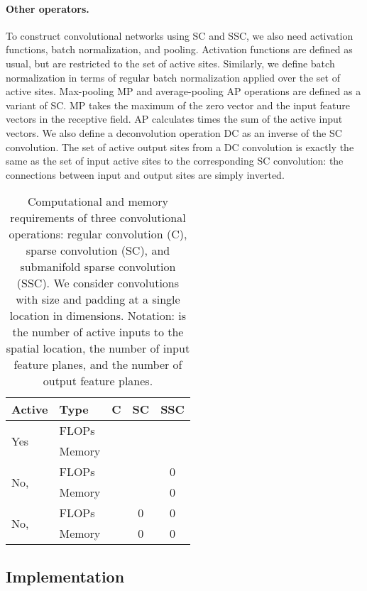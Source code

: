 \documentclass[10pt,twocolumn,letterpaper]{article}
\begin{document}
\paragraph{Other operators.} To construct convolutional networks using SC and SSC, we also need activation functions, batch normalization, and pooling. Activation functions are defined as usual, but are restricted to the set of active sites. Similarly, we define batch normalization in terms of regular batch normalization applied over the set of active sites. Max-pooling MP and average-pooling AP operations are defined as a variant of SC. MP takes the maximum of the zero
vector and the input feature vectors in the receptive field. AP calculates  times the sum of the active input vectors. We also define a deconvolution \cite{zeiler10} operation DC as an inverse of the SC convolution. The set of active output sites from a DC convolution is exactly the same as the set of input active sites to the corresponding SC convolution: the connections between input and output sites are simply inverted.

\begin{table}
\centering{}\begin{tabular}{ll|ccc}\toprule
 \textbf{Active} & \textbf{Type} & \textbf{C} & \textbf{SC} & \textbf{SSC}\\
\midrule
\multirow{2}{*}{Yes} &  FLOPs &  &  & \\
                           &  Memory &  &  &  \\
\midrule
\multirow{2}{*}{No, } &  FLOPs &  &  & 0\\
                           &  Memory &  &  & 0\\
\midrule
\multirow{2}{*}{No, } &  FLOPs &  & 0 & 0\\
                           &  Memory &  & 0 & 0\\
\bottomrule
\end{tabular}
\caption{Computational and memory requirements of three convolutional operations: regular convolution (C), sparse convolution (SC), and submanifold sparse convolution (SSC). We consider convolutions with size  and padding  at a single location
in  dimensions. Notation:  is the number of active inputs to
the spatial location,  the number of input feature planes, and
 the number of output feature planes.}\label{tbl:flops}
\end{table}


\subsection{Implementation}
\end{document}
